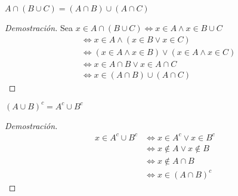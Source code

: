 \documentclass{../Topologia.tex}
\begin{document}
\begin{prop}
	$A\cap (B\cup C) = (A\cap B)\cup (A\cap C)$ 
\end{prop}
\begin{proof}[Demostración]
	Sea $x \in A\cap (B\cup C) \iff x \in A \wedge x \in B \cup C$
	\begin{equation}
		\begin{split}
			&\iff x \in A \wedge (x \in B \vee x \in C)\\
			&\iff (x\in A \wedge x \in B) \vee (x \in A \wedge x \in C)\\
			&\iff x \in A\cap B \vee x \in A \cap C\\
			&\iff x \in (A\cap B) \cup (A\cap C)
		\end{split}
	\end{equation}
\end{proof}
\begin{prop}
	$(A\cup B)^{c} = A^{c} \cup B^{c}$ 
\end{prop}
\begin{proof}[Demostración]
	\begin{equation}
		\begin{split}
			x \in A^{c} \cup B^{c} &\iff x \in A^{c} \vee x \in B^{c}\\
								   &\iff x \notin A \vee x \notin B\\
								   &\iff x \notin A\cap B\\
								   &\iff x \in (A\cap B)^{c}
		\end{split}
	\end{equation}
\end{proof}
\end{document}
